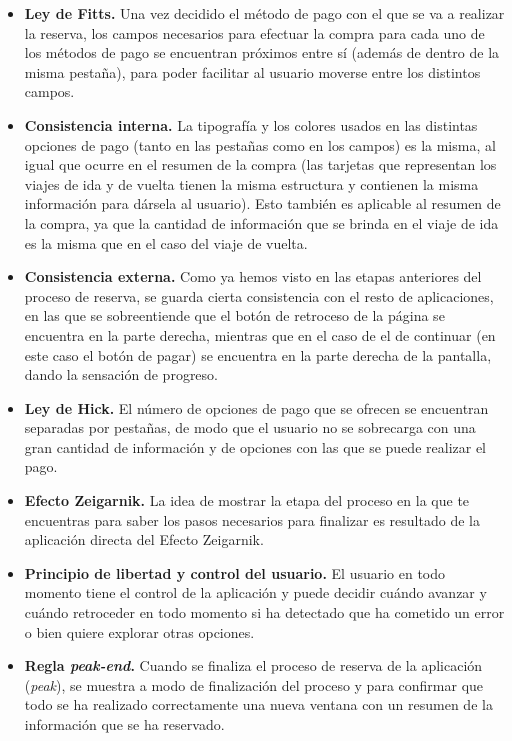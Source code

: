 \begin{itemize}
    \item \textbf{Ley de Fitts.} Una vez decidido el método de pago con el que se va a realizar la reserva, los campos
        necesarios para efectuar la compra para cada uno de los métodos de pago se encuentran próximos entre sí
        (además de dentro de la misma pestaña), para poder facilitar al usuario moverse entre los distintos campos.
    \item \textbf{Consistencia interna.} La tipografía y los colores usados en las distintas opciones de pago (tanto en las
        pestañas como en los campos) es la misma, al igual que ocurre en el resumen de la compra (las tarjetas que
        representan los viajes de ida y de vuelta tienen la misma estructura y contienen la misma información para
        dársela al usuario). Esto también es aplicable al resumen de la compra, ya que la cantidad de información
        que se brinda en el viaje de ida es la misma que en el caso del viaje de vuelta.
    \item \textbf{Consistencia externa.} Como ya hemos visto en las etapas anteriores del proceso de reserva, se
        guarda cierta consistencia con el resto de aplicaciones, en las que se sobreentiende que el botón de retroceso
        de la página se encuentra en la parte derecha, mientras que en el caso de el de continuar (en este caso el
        botón de pagar) se encuentra en la parte derecha de la pantalla, dando la sensación de progreso.
    \item \textbf{Ley de Hick.} El número de opciones de pago que se ofrecen se encuentran separadas por pestañas,
        de modo que el usuario no se sobrecarga con una gran cantidad de información y de opciones con las que se
        puede realizar el pago.
    \item \textbf{Efecto Zeigarnik.} La idea de mostrar la etapa del proceso en la que te encuentras para saber los
        pasos necesarios para finalizar es resultado de la aplicación directa del Efecto Zeigarnik.
    \item \textbf{Principio de libertad y control del usuario.} El usuario en todo momento tiene el control de la aplicación
        y puede decidir cuándo avanzar y cuándo retroceder en todo momento si ha detectado que ha cometido un error
        o bien quiere explorar otras opciones.
    \item \textbf{Regla \textit{peak-end}.} Cuando se finaliza el proceso de reserva de la aplicación (\textit{peak}), se muestra a modo
        de finalización del proceso y para confirmar que todo se ha realizado correctamente una nueva ventana con
        un resumen de la información que se ha reservado.
\end{itemize}
